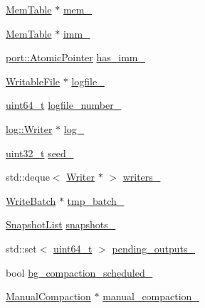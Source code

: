 \begin{DoxyCompactItemize}
\hyperlink{classleveldb_1_1_mem_table}{Mem\-Table} $\ast$ \hyperlink{classleveldb_1_1_d_b_impl_aefd884bca37cac9d0ca8e95bcfe3cf99}{mem\-\_\-}
\item 
\hyperlink{classleveldb_1_1_mem_table}{Mem\-Table} $\ast$ \hyperlink{classleveldb_1_1_d_b_impl_a30113cfca275feffb91d19c70e793877}{imm\-\_\-}
\item 
\hyperlink{classleveldb_1_1port_1_1_atomic_pointer}{port\-::\-Atomic\-Pointer} \hyperlink{classleveldb_1_1_d_b_impl_a9185615d9bbbee710a20a91fe2920840}{has\-\_\-imm\-\_\-}
\item 
\hyperlink{classleveldb_1_1_writable_file}{Writable\-File} $\ast$ \hyperlink{classleveldb_1_1_d_b_impl_aa4a09862f1997dfe4113660aff9faca3}{logfile\-\_\-}
\item 
\hyperlink{stdint_8h_aaa5d1cd013383c889537491c3cfd9aad}{uint64\-\_\-t} \hyperlink{classleveldb_1_1_d_b_impl_afe73d34a9bf23ef0847a879ae697b49c}{logfile\-\_\-number\-\_\-}
\item 
\hyperlink{classleveldb_1_1log_1_1_writer}{log\-::\-Writer} $\ast$ \hyperlink{classleveldb_1_1_d_b_impl_a3e9f6cad8fa559b2afcee4774baee316}{log\-\_\-}
\item 
\hyperlink{stdint_8h_a435d1572bf3f880d55459d9805097f62}{uint32\-\_\-t} \hyperlink{classleveldb_1_1_d_b_impl_adf273f65cae24a966caeb59babe03870}{seed\-\_\-}
\item 
std\-::deque$<$ \hyperlink{structleveldb_1_1_d_b_impl_1_1_writer}{Writer} $\ast$ $>$ \hyperlink{classleveldb_1_1_d_b_impl_a6f810e4d78d7cae052c365dfd3ceea7f}{writers\-\_\-}
\item 
\hyperlink{classleveldb_1_1_write_batch}{Write\-Batch} $\ast$ \hyperlink{classleveldb_1_1_d_b_impl_a2d49c9995c09c4dffed36f4d913e66ef}{tmp\-\_\-batch\-\_\-}
\item 
\hyperlink{classleveldb_1_1_snapshot_list}{Snapshot\-List} \hyperlink{classleveldb_1_1_d_b_impl_ad8e023a20abe62817c3fad7fbff5bd00}{snapshots\-\_\-}
\item 
std\-::set$<$ \hyperlink{stdint_8h_aaa5d1cd013383c889537491c3cfd9aad}{uint64\-\_\-t} $>$ \hyperlink{classleveldb_1_1_d_b_impl_ae4ac10358a8b616a0d1091489730b760}{pending\-\_\-outputs\-\_\-}
\item 
bool \hyperlink{classleveldb_1_1_d_b_impl_a0f9a6ce141d1aace77fc15538b0d7f63}{bg\-\_\-compaction\-\_\-scheduled\-\_\-}
\item 
\hyperlink{structleveldb_1_1_d_b_impl_1_1_manual_compaction}{Manual\-Compaction} $\ast$ \hyperlink{classleveldb_1_1_d_b_impl_a38883b690ab41bd95764a1008f2118c0}{manual\-\_\-compaction\-\_\-}

\end{DoxyCompactItemize}
